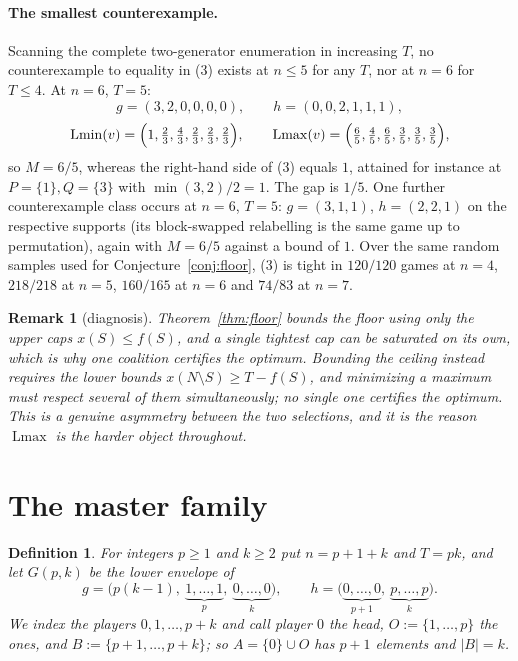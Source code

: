 \documentclass[11pt]{article}
\newtheorem{definition}[theorem]{Definition}
\newtheorem{remark}[theorem]{Remark}
\newcommand{\Lmin}{\operatorname{Lmin}}
\newcommand{\Lmax}{\operatorname{Lmax}}
\begin{document}
\paragraph{The smallest counterexample.}
Scanning the complete two-generator enumeration in increasing $T$, no
counterexample to equality in (3) exists at $n\le5$ for any $T$, nor at $n=6$
for $T\le4$.  At $n=6$, $T=5$:
\[
 g=(3,2,0,0,0,0),\qquad h=(0,0,2,1,1,1),
\]
\[
 \Lmin(v)=\Bigl(1,\tfrac23,\tfrac43,\tfrac23,\tfrac23,\tfrac23\Bigr),
 \qquad
 \Lmax(v)=\Bigl(\tfrac65,\tfrac45,\tfrac65,\tfrac35,\tfrac35,\tfrac35\Bigr),
\]
so $M=6/5$, whereas the right-hand side of (3) equals $1$, attained for
instance at $P=\{1\},Q=\{3\}$ with $\min(3,2)/2=1$.  The gap is $1/5$.  One
further counterexample class occurs at $n=6$, $T=5$: $g=(3,1,1)$,
$h=(2,2,1)$ on the respective supports (its block-swapped relabelling is the
same game up to permutation), again with $M=6/5$ against a bound of $1$.  Over the same random samples used for
Conjecture~\ref{conj:floor}, (3) is tight in $120/120$ games at $n=4$,
$218/218$ at $n=5$, $160/165$ at $n=6$ and $74/83$ at $n=7$.

\begin{remark}[diagnosis]\label{rem:asymmetry}
Theorem~\ref{thm:floor} bounds the floor using only the upper caps
$x(S)\le f(S)$, and a single tightest cap can be saturated on its own, which
is why one coalition certifies the optimum.  Bounding the ceiling instead
requires the lower bounds $x(N\setminus S)\ge T-f(S)$, and \emph{minimizing}
a maximum must respect several of them simultaneously; no single one
certifies the optimum.  This is a genuine asymmetry between the two
selections, and it is the reason $\Lmax$ is the harder object throughout.
\end{remark}

\section{The master family}\label{sec:family}

\begin{definition}\label{def:family}
For integers $p\ge1$ and $k\ge2$ put $n=p+1+k$ and $T=pk$, and let $G(p,k)$
be the lower envelope of
\[
 g=\bigl(p(k-1),\ \underbrace{1,\dots,1}_{p},\ \underbrace{0,\dots,0}_{k}\bigr),
 \qquad
 h=\bigl(\underbrace{0,\dots,0}_{p+1},\ \underbrace{p,\dots,p}_{k}\bigr).
\]
We index the players $0,1,\dots,p+k$ and call player $0$ the \emph{head},
$O:=\{1,\dots,p\}$ the \emph{ones}, and $B:=\{p+1,\dots,p+k\}$; so
$A=\{0\}\cup O$ has $p+1$ elements and $|B|=k$.
\end{definition}
\end{document}
